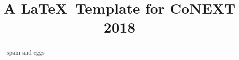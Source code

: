 \documentclass[10pt,sigconf,letterpaper,anonymous]{acmart}
\begin{document}
\title{A \LaTeX\ Template for CoNEXT 2018}



\begin{abstract}
spam and eggs
\end{abstract}

\maketitle



\end{document}

